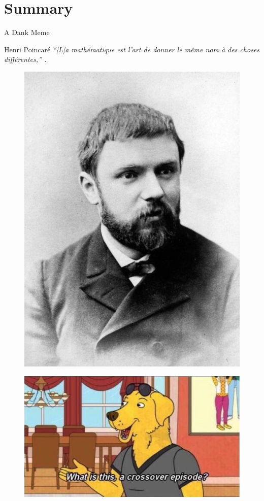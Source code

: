 \section{Summary}

\begin{frame}{A Dank Meme}
    \begin{block}{Henri Poincaré}
        \emph{``[L]a mathématique est l'art de donner le même nom à des choses différentes,'' \cite{HP1908}.}
    \end{block}

\begin{figure}
\centering
\begin{minipage}{.5\textwidth}
  \centering
  \includegraphics[width=.5\linewidth]{resources/poincare.jpg}
  \label{fig:test1}
\end{minipage}%
\begin{minipage}{.5\textwidth}
  \centering
  \includegraphics[height=.6\linewidth]{resources/meme.jpg}
  \label{fig:test2}
\end{minipage}
\end{figure}

\end{frame}

